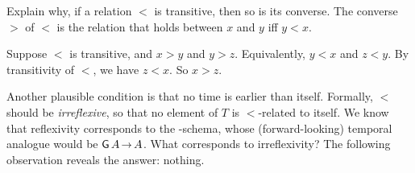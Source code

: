 \begin{exercise}
  Explain why, if a relation $<$ is transitive, then so is its converse. The
  converse $>$ of $<$ is the relation that holds between $x$ and $y$ iff $y<x$.
\end{exercise}
\begin{solution}
  Suppose $<$ is transitive, and $x > y$ and $y > z$. Equivalently, $y < x$ and
  $z < y$. By transitivity of $<$, we have $z < x$. So $x > z$.
\end{solution}

Another plausible condition is that no time is earlier than itself. Formally,
$<$ should be \emph{irreflexive}, so that no element of $T$ is $<$-related to
itself. We know that reflexivity corresponds to the -schema, whose
(forward-looking) temporal analogue would be $\tG A \to A$. What corresponds to
irreflexivity? The following observation reveals the answer: nothing.

